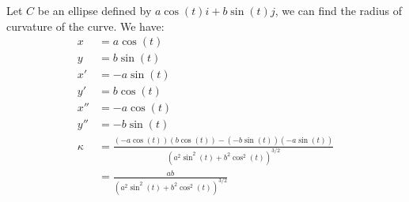 \documentclass[11pt]{article}
\begin{document}
\begin{example}[Ellipse]
    Let $C$ be an ellipse defined by $a\cos(t)i + b\sin(t)j$, we can find the radius of curvature of the curve. We have:
    \begin{align*}
        x &= a\cos(t) \\
        y &= b\sin(t) \\
        x' &= -a\sin(t) \\
        y' &= b\cos(t) \\
        x'' &= -a\cos(t) \\
        y'' &= -b\sin(t) \\
        \kappa &= \frac{(-a\cos(t))(b\cos(t)) - (-b\sin(t))(-a\sin(t))}{(a^2\sin^2(t) + b^2\cos^2(t))^{3/2}} \\
        &= \frac{ab}{(a^2\sin^2(t) + b^2\cos^2(t))^{3/2}}
    \end{align*}
\end{example}
\end{document}
